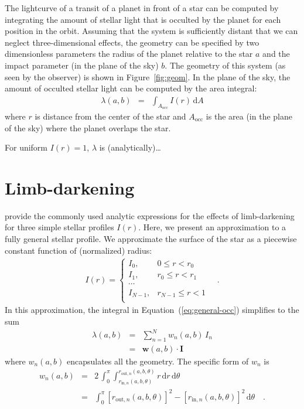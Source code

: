 \documentclass[12pt,preprint]{aastex}
\newcommand{\Fig}[1]{Figure~\ref{fig:#1}}
\newcommand{\fig}[1]{\Fig{#1}}
\newcommand{\Eq}[1]{Equation~(\ref{eq:#1})}
\newcommand{\eq}[1]{\Eq{#1}}
\newcommand{\eqlabel}[1]{\label{eq:#1}}
\newcommand{\dd}{\mathrm{d}}
\newcommand{\bvec}[1]{\boldsymbol{#1}}
\begin{document}
The lightcurve of a transit of a planet in front of a star can be computed by
integrating the amount of stellar light that is occulted by the planet for
each position in the orbit. Assuming that the system is sufficiently distant
that we can neglect three-dimensional effects, the geometry can be specified
by two dimensionless parameters the radius of the planet relative to the
star $a$ and the impact parameter (in the plane of the sky) $b$. The geometry
of this system (as seen by the observer) is shown in \fig{geom}. In the plane
of the sky, the amount of occulted stellar light can be computed by the area
integral:
\begin{eqnarray}\eqlabel{general-occ}
    \lambda (a, b) & = & \int_{A_\mathrm{occ}} I(r) \, \dd A
\end{eqnarray}
where $r$ is distance from the center of the star and $A_\mathrm{occ}$ is the
area (in the plane of the sky) where the planet overlaps the star.

For uniform $I(r) = 1$, $\lambda$ is (analytically)\ldots


\section{Limb-darkening}

\citet{mandel} provide the commonly used analytic expressions for the effects
of limb-darkening for three simple stellar profiles $I(r)$. Here, we present
an approximation to a fully general stellar profile. We approximate the
surface of the star as a piecewise constant function of (normalized) radius:
\begin{eqnarray}
    I(r) = \left \{ \begin{array}{ll}
        I_0, & 0 \le r < r_0 \\
        I_1, & r_0 \le r < r_1 \\
        \cdots & \\
        I_{N-1}, & r_{N-1} \le r < 1 \\
    \end{array}\right . \quad.
\end{eqnarray}
In this approximation, the integral in \eq{general-occ} simplifies to the sum
\begin{eqnarray}
    \lambda(a, b) & = & \sum_{n=1}^N w_n (a, b) \, I_n \\
                  & = & \bvec{w} (a, b) \cdot \bvec{I}
\end{eqnarray}
where $w_n(a, b)$ encapsulates all the geometry. The specific form of $w_n$ is
\begin{eqnarray}
    w_n (a, b) & = & 2 \, \int_0 ^\pi \int_{r_{\mathrm{in},n} (a, b, \theta)}
        ^{r_{\mathrm{out},n} (a, b, \theta)} r \, \dd r \, \dd \theta \\
    & = & \int_0 ^\pi [ r_{\mathrm{out},n} (a, b, \theta) ]^2  -
        [ r_{\mathrm{in},n} (a, b, \theta) ]^2 \, \dd \theta
    \quad.
\end{eqnarray}
\end{document}
